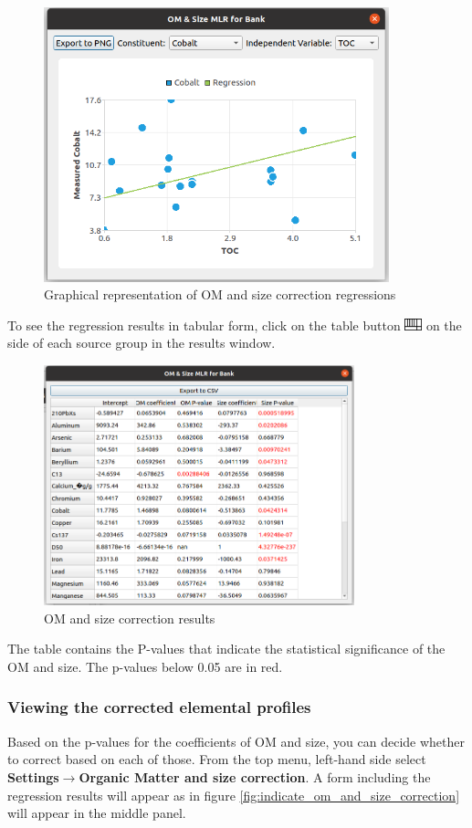 \documentclass[12pt]{report}
\begin{document}
\begin{figure}[ht]
    \centering
    \includegraphics[width=10cm]{Figures/Regression_results.png}
    \caption{Graphical representation of OM and size correction regressions}
    \label{fig:regression_results}
\end{figure}
\FloatBarrier
To see the regression results in tabular form, click on the table button \includegraphics[width=0.5cm]{Figures/table.png} on the side of each source group in the results window. 

\begin{figure}[ht]
    \centering
    \includegraphics[width=9cm]{Figures/Regression_Tabular_results.png}
    \caption{OM and size correction results}
    \label{fig:regression_results}
\end{figure}
\FloatBarrier
The table contains the P-values that indicate the statistical significance of the OM and size. The p-values below 0.05 are in red.   

\subsubsection{Viewing the corrected elemental profiles}
Based on the p-values for the coefficients of OM and size, you can decide whether to correct based on each of those. From the top menu, left-hand side select \textbf{Settings}$\rightarrow$\textbf{Organic Matter and size correction}. A form including the regression results will appear as in figure \ref{fig:indicate_om_and_size_correction} will appear in the middle panel. 
\end{document}
